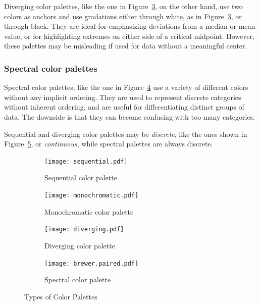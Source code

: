Diverging color palettes, like the one in Figure~\ref{fig:diverging}, on the other hand, use two colors as anchors and use gradations either through white, as in Figure~\ref{fig:diverging}, or through black. They are ideal for emphasizing deviations from a median or mean value, or for highlighting extremes on either side of a critical midpoint. However, these palettes may be misleading if used for data without a meaningful center.

\subsubsection*{Spectral color palettes}

Spectral color palettes, like the one in Figure~\ref{fig:spectral} use a variety of different colors without any implicit ordering. They are used to represent discrete categories without inherent ordering, and are useful for differentiating distinct groups of data. The downside is that they can become confusing with too many categories. 

Sequential and diverging color palettes may be \emph{discrete}, like the ones shown in Figure~\ref{fig:palettes}, or \emph{continuous}, while spectral palettes are always discrete.

\begin{figure}
\begin{subfigure}{\textwidth}
\centering
\texttt{[image: sequential.pdf]}
\caption{Sequential color palette} 
\label{fig:sequential}
\end{subfigure}

\begin{subfigure}{\textwidth}
\centering
\texttt{[image: monochromatic.pdf]}
\caption{Monochromatic color palette} 
\label{fig:monchromatic}
\end{subfigure}

\begin{subfigure}{\textwidth}
\centering
\texttt{[image: diverging.pdf]}
\caption{Diverging color palette} 
\label{fig:diverging}
\end{subfigure}

\begin{subfigure}{\textwidth}
\centering
\texttt{[image: brewer.paired.pdf]}
\caption{Spectral color palette} 
\label{fig:spectral}
\end{subfigure}

\caption{Types of Color Palettes}
\label{fig:palettes}
\end{figure}

